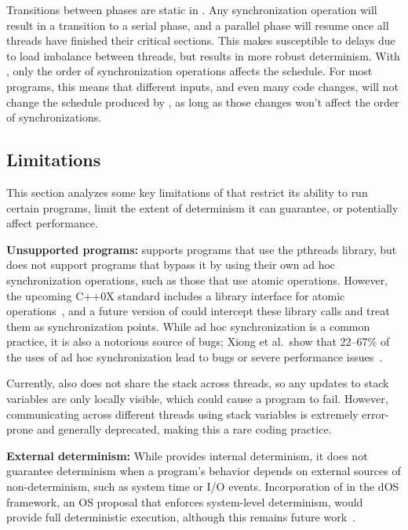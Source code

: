 Transitions between phases are static in \dthreads{}.  Any synchronization operation will result in a transition to a serial phase, and a parallel phase
will resume once all threads have finished their critical sections.  This makes \dthreads{} susceptible to delays due to load imbalance between threads, but results in more robust determinism.  With \dthreads{}, only the order of synchronization operations affects the schedule. For most programs, this means that different inputs, and even many code changes, will not change the schedule produced by \dthreads{}, as long as those changes won't affect the order of synchronizations.

\subsection{Limitations}
\label{sec:limitations}

This section analyzes some key limitations of \dthreads{} that restrict its ability to run certain programs, limit the extent of determinism it can guarantee, or potentially affect performance.

\textbf{Unsupported programs: }
\dthreads{} supports programs that
use the pthreads library, but does not support programs that
bypass it by using their own ad hoc synchronization operations, such as those that use atomic operations. However, the upcoming C++0X standard includes a library interface for atomic operations~\cite[pp. 1107--1128]{c++0xstandarddraft}, and a future version of \dthreads{} could intercept these library calls and treat them as synchronization points. While ad hoc synchronization is a common practice, it is also a notorious source of bugs; Xiong et al.\ show that 22--67\% of the uses of ad hoc
synchronization lead to bugs or severe performance issues~\cite{ad-hoc-considered-harmful}.

Currently, \dthreads{} also does not share the stack
across threads, so any updates to stack variables are only locally visible, which could cause a program to fail. However, communicating across different threads using stack variables  is extremely error-prone and generally deprecated, making this a rare coding practice.

\textbf{External determinism: }
While \dthreads{} provides internal determinism, it does not guarantee determinism when a program's behavior depends on external sources of non-determinism, such as system time or I/O events. Incorporation of \dthreads{} in the dOS framework, an OS proposal that enforces system-level determinism, would provide full deterministic execution, although this remains future work~\cite{deterministic-process-groups}.

